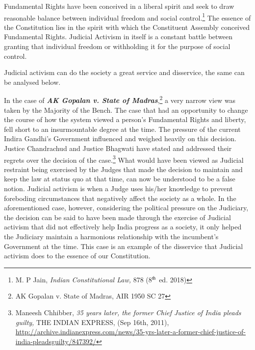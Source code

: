 \begin{multicols}{2}
\vspace{1.2cm}


\noi
Fundamental Rights have been conceived in a liberal spirit and seek to draw reasonable
balance between individual freedom and social control.\footnote{M. P Jain, \textit{Indian Constitutional Law,} 878 (8$^{\rm th}$ ed. 2018)}
 The essence of the Constitution lies in the spirit with which the Constituent Assembly conceived Fundamental Rights. Judicial
Activism in itself is a constant battle between granting that individual freedom or withholding
it for the purpose of social control. 

\noi
Judicial activism can do the society a great service and disservice, the same can be analysed
below.

\noi
In the case of \textbf{\textit{AK Gopalan v. State of Madras}},\footnote{AK Gopalan v. State of Madras, AIR 1950 SC 27}  a very narrow view was taken by the
Majority of the Bench. The case that had an opportunity to change the course of how the
system viewed a person’s Fundamental Rights and liberty, fell short to an insurmountable
degree at the time. The pressure of the current Indira Gandhi’s Government influenced and
weighed heavily on this decision. Justice Chandrachud and Justice Bhagwati have stated and
addressed their regrets over the decision of the case.\footnote{Maneesh Chhibber, \textit{35 years later, the former Chief Justice of India pleads guilty,} THE INDIAN EXPRESS, (Sep 16th, 2011), \url{http://archive.indianexpress.com/news/35-yrs-later-a-former-chief-justice-of-india-pleadsguilty/847392/}}  What would have been viewed as Judicial restraint being exercised by the Judges that made the decision to maintain and keep
the law at status quo at that time, can now be understood to be a false notion. Judicial
activism is when a Judge uses his/her knowledge to prevent foreboding circumstances that
negatively affect the society as a whole. In the aforementioned case, however, considering the
political pressure on the Judiciary, the decision can be said to have been made through the
exercise of Judicial activism that did not effectively help India progress as a society, it only
helped the Judiciary maintain a harmonious relationship with the incumbent’s Government at
the time. This case is an example of the disservice that Judicial activism does to the essence
of our Constitution.


\end{multicols}
